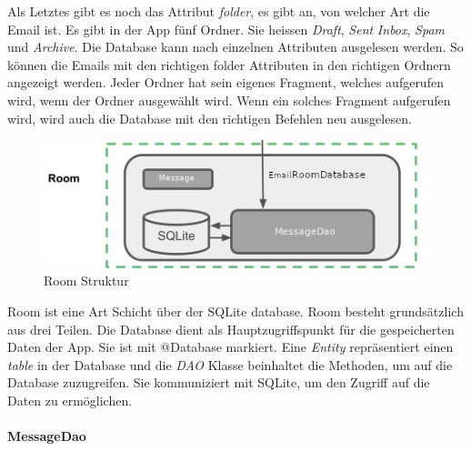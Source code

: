 \documentclass[a4paper,11pt]{article}
\begin{document}
Als Letztes gibt es noch das Attribut \textit{folder}, es gibt an, von welcher Art die Email ist. Es gibt in der App fünf Ordner. Sie heissen \textit{Draft}, \textit{Sent} 
\textit{Inbox}, \textit{Spam} und \textit{Archive}. Die Database kann nach einzelnen Attributen ausgelesen werden. So können die Emails mit den richtigen
folder Attributen in den richtigen Ordnern angezeigt werden. Jeder Ordner hat sein eigenes Fragment, welches aufgerufen wird, wenn der Ordner ausgewählt wird.
Wenn ein solches Fragment aufgerufen wird, wird auch die Database mit den richtigen Befehlen neu ausgelesen.  \\




\newpage
\begingroup
\setlength{\intextsep}{10pt}
\setlength{\columnsep}{15pt}

\begin{figure}
    \centering
    \includegraphics[width=.4\textwidth]{media/RoomStructure.png}
    \caption{Room Struktur \cite{appStructurePicture}}
\end{figure}



Room ist eine Art Schicht über der SQLite database. 
Room besteht grundsätzlich aus drei Teilen. Die Database dient als Hauptzugriffspunkt für die gespeicherten Daten der App. Sie ist mit @Database markiert. 
Eine \textit{Entity} repräsentiert einen \textit{table} in der Database und die \textit{DAO} Klasse beinhaltet die Methoden, um auf die Database zuzugreifen. Sie kommuniziert
mit SQLite, um den Zugriff auf die Daten zu ermöglichen. \cite{roomStructure}


\paragraph{MessageDao}
\end{document}
